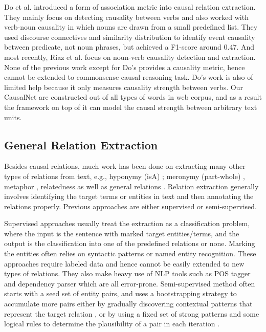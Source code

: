 Do et al. \cite{do2011minimally} introduced a form of association
metric into causal relation extraction. They mainly focus on
detecting causality between verbs and also worked with verb-noun
causality in which nouns are drawn from a small predefined list.
They used discourse connectives and similarity distribution to
identify event causality between predicate, not noun phrases, but
achieved a F1-score around 0.47. And most recently, Riaz et al.
\cite{riaz2014recognizing} focus on noun-verb causality detection
and extraction. None of the previous work except for Do's provides a
causality metric, hence cannot be extended to commonsense causal
reasoning task. Do's work is also of limited help because it only
measures causality strength between verbs. Our CausalNet are
constructed out of all types of words in web corpus, and as a result
the framework on top of it can model the causal strength between
arbitrary text units.

\subsection{General Relation Extraction}
Besides causal relations, much work has been done on extracting many
other types of relations from text, e.g., hyponymy (isA)
\cite{Etzioni:Web,12MSRA:Probase}; meronymy (part-whole)
\cite{GirjuBM06}, metaphor \cite{LiZW13}, relatedness
\cite{Zhang15:Assoc} as well as general relations
\cite{Banko:TextRunner,S:YAGO,S:YAGO2,fader2011identifying,NakasholeWS12}.
Relation extraction generally involves identifying the target terms
or entities in text and then annotating the relations properly.
Previous approaches are either supervised or semi-supervised.

Supervised approaches usually treat the extraction as a
classification problem, where the input is the sentence with marked
target entities/terms, and the output is the classification into one
of the predefined relations or none. Marking the entities often
relies on syntactic patterns or named entity recognition. These
approaches require labeled data and hence cannot be easily extended
to new types of relations. They also make heavy use of NLP tools
such as POS tagger and dependency parser which are all error-prone.
Semi-supervised method often starts with a seed set of entity pairs,
and uses a bootstrapping strategy to accumulate more pairs either by
gradually discovering contextual patterns that represent the target
relation \cite{Etzioni:Web}, or by using a fixed set of strong
patterns and some logical rules to determine the plausibility of a
pair in each iteration \cite{12MSRA:Probase}.

